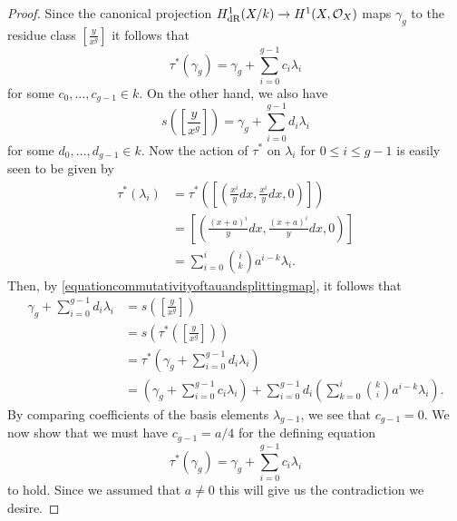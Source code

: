 \begin{proof}
    Since the canonical projection $H_{\text {dR}}^1(X/k) \rightarrow H^1(X,\mathcal{O}_X)$ maps $\gamma_g$ to the residue class $\left[ \frac{y}{x^g} \right]$ it follows that
        \[
        \tau^*(\gamma_g) = \gamma_g + \sum_{i=0}^{g-1} c_i\lambda_i
        \]
    for some $c_0, \ldots, c_{g-1} \in k$.
    On the other hand, we also have
        \[
        s\left( \left[ \frac{y}{x^g} \right] \right)  = \gamma_g + \sum_{i=0}^{g-1}d_i \lambda_i
        \]
    for some $d_0, \ldots, d_{g-1} \in k$.
    Now the action of $\tau^*$ on $\lambda_i$ for $0 \leq i \leq g-1$ is easily seen to be given by
        \begin{align*}
        \tau^*(\lambda_i) & = \tau^*\left( \left[ \left( \frac{x^i}{y}dx, \frac{x^i}{y}dx, 0\right) \right] \right) \\
        & = \left[ \left( \frac{(x+a)^i}{y}dx, \frac{(x+a)^i}{y}dx, 0 \right) \right] \\
        & = \sum_{i=0}^i \binom{i}{k} a^{i-k} \lambda_i.
        \end{align*}
    Then, by \eqref{equationcommutativityoftauandsplittingmap}, it follows that
        \begin{align*}
        \gamma_g + \sum_{i=0}^{g-1} d_i\lambda_i & = s \left( \left[ \frac{y}{x^g} \right] \right) \\
        & = s \left( \tau^*\left( \left[ \frac{y}{x^g} \right] \right) \right) \\
        & = \tau^* \left( \gamma_g + \sum_{i=0}^{g-1} d_i \lambda_i \right) \\
        & = \left( \gamma_g + \sum_{i=0}^{g-1} c_i \lambda_i \right) + \sum_{i=0}^{g-1} d_i \left( \sum_{k = 0}^i \binom{k}{i} a^{i-k} \lambda_i \right).
        \end{align*}
    By comparing coefficients of the basis elements $\lambda_{g-1}$, we see that $c_{g-1} = 0$.
    We now show that we must have $c_{g-1} = a/4$ for the defining equation
        \[
        \tau^*(\gamma_g) = \gamma_g + \sum_{i=0}^{g-1} c_i \lambda_i
        \]
    to hold.
    Since we assumed that $a \neq 0$ this will give us the contradiction we desire.


\end{proof}
